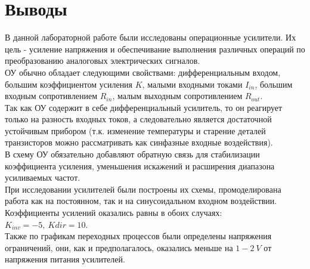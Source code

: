 \documentclass[12pt]{article}
\begin{document}
\section*{Выводы}
В данной лабораторной работе были исследованы операционные усилители. Их цель - усиление напряжения и обеспечивание выполнения различных операций по преобразованию аналоговых электрических сигналов. \\
ОУ обычно обладает следующими свойствами: дифференциальным входом, большим коэффициентом усиления $K$, малыми входными токами $I_{in}$, большим входным сопротивлением $R_{in}$, малым выходным сопротивлением $R_{out}$. \\
Так как ОУ содержит в себе дифференциальный усилитель, то он реагирует только на разность входных токов, а следовательно является достаточной устойчивым прибором (т.к. изменение температуры и старение деталей транзисторов можно рассматривать как синфазные входные воздействия). \\
В схему ОУ обязательно добавляют обратную связь для стабилизации коэффициента усиления, уменьшения искажений и расширения диапазона усиливаемых частот.
\ \\
При исследовании усилителей были построены их схемы, промоделирована работа как на постоянном, так и на синусоидальном входном воздействии. Коэффициенты усилений оказались равны в обоих случаях: $K_{inv} = -5, \ K{dir} = 10$. \\
Также по графикам переходных процессов были определены напряжения ограничений, они, как и предполагалось, оказались меньше на $1-2 \ V$ от напряжения питания усилителей.
\end{document}
